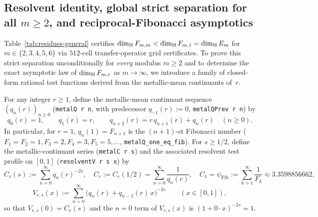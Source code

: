 \subsection{Resolvent identity, global strict separation for all \texorpdfstring{$m\ge2$}{m >= 2}, and reciprocal-Fibonacci asymptotics}\label{sec:residues-asymptotic}

Table~\ref{tab:residues-general} certifies $\dim_{\mathrm{H}} F_{m,m}<\dim_{\mathrm{H}} F_{m,1}=\dim_{\mathrm{H}} E_m$
for $m\in\{2,3,4,5,6\}$ via $512$-cell transfer-operator grid certificates. To
prove this strict separation unconditionally for \emph{every} modulus $m\ge2$ and
to determine the exact asymptotic law of $\dim_{\mathrm{H}} F_{m,r}$ as $m\to\infty$, we
introduce a family of closed-form rational test functions derived from the
metallic-mean continuants of~$r$.

For any integer $r\ge1$, define the metallic-mean continuant sequence
$(q_n(r))_{n\ge0}$ (\texttt{metalQ r n}, with predecessor $q_{-1}(r):=0$,
\texttt{metalQPrev r n}) by
\begin{equation}\label{eq:metallic-continuant}
q_0(r)=1,\qquad q_1(r)=r,\qquad q_{n+2}(r)=r\,q_{n+1}(r)+q_n(r)\quad(n\ge0).
\end{equation}
In particular, for $r=1$, $q_n(1)=F_{n+1}$ is the $(n+1)$-st Fibonacci number
($F_1=F_2=1,F_3=2,F_4=3,F_5=5,\dots$, \texttt{metalQ\_\allowbreak one\_\allowbreak eq\_\allowbreak fib}).
For $s\ge1/2$, define the metallic-continuant series (\texttt{metalC r s}) and
the associated resolvent test profile on $[0,1]$ (\texttt{resolventV r s x}) by
\begin{equation}\label{eq:Cr-Dr}
C_r(s):=\sum_{n=0}^\infty q_n(r)^{-2s},\quad
C_r:=C_r(1/2)=\sum_{n=0}^\infty\frac{1}{q_n(r)},\quad
C_1=\psi_{\mathrm{Fib}}:=\sum_{k=1}^\infty\frac{1}{F_k}\approx 3.3598856662,
\end{equation}
\[
V_{r,s}(x):=\sum_{n=0}^\infty\bigl(q_n(r)+q_{n-1}(r)\,x\bigr)^{-2s}\qquad(x\in[0,1]),
\]
so that $V_{r,s}(0)=C_r(s)$ and the $n=0$ term of $V_{r,s}(x)$ is $(1+0\cdot x)^{-2s}=1$.

